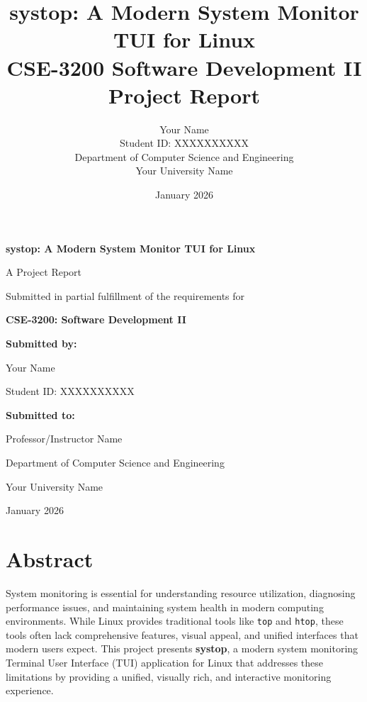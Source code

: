 \documentclass[12pt,a4paper,oneside]{report}
\title{
    \textbf{systop: A Modern System Monitor TUI for Linux}\\
    \vspace{1cm}
    \large CSE-3200 Software Development II\\
    Project Report
}
\author{Your Name\\
Student ID: XXXXXXXXXX\\
\vspace{0.5cm}
Department of Computer Science and Engineering\\
Your University Name}
\date{January 2026}
\begin{document}
\begin{titlepage}
    \centering
    \vspace*{2cm}
    
    {\LARGE\bfseries systop: A Modern System Monitor TUI for Linux\par}
    \vspace{1.5cm}
    
    {\Large A Project Report\par}
    \vspace{0.5cm}
    {\large Submitted in partial fulfillment of the requirements for\par}
    \vspace{0.3cm}
    {\Large\bfseries CSE-3200: Software Development II\par}
    \vspace{2cm}
    
    {\large\bfseries Submitted by:\par}
    \vspace{0.3cm}
    {\large Your Name\par}
    {\normalsize Student ID: XXXXXXXXXX\par}
    \vspace{2cm}
    
    {\large\bfseries Submitted to:\par}
    \vspace{0.3cm}
    {\large Professor/Instructor Name\par}
    \vspace{0.3cm}
    {\normalsize Department of Computer Science and Engineering\par}
    {\normalsize Your University Name\par}
    \vfill
    
    {\large January 2026\par}
\end{titlepage}

\newpage
\null
\thispagestyle{empty}
\newpage

\newpage
\null
\thispagestyle{empty}
\newpage

\tableofcontents
{}

\chapter*{Abstract}

System monitoring is essential for understanding resource utilization, diagnosing performance issues, and maintaining system health in modern computing environments. While Linux provides traditional tools like \texttt{top} and \texttt{htop}, these tools often lack comprehensive features, visual appeal, and unified interfaces that modern users expect. This project presents \textbf{systop}, a modern system monitoring Terminal User Interface (TUI) application for Linux that addresses these limitations by providing a unified, visually rich, and interactive monitoring experience.
\end{document}
